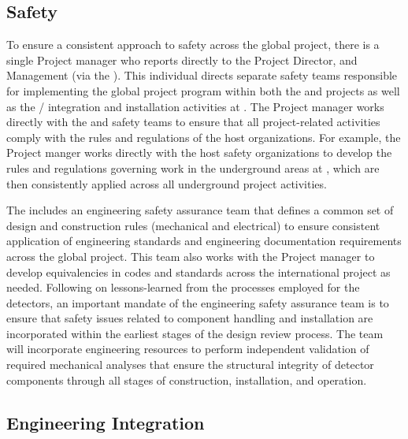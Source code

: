 \subsection{Safety}
\label{sec:dune_safety}

To ensure a consistent approach to safety across the global project,
there is a single Project  manager who reports directly to
the  Project Director,  and 
Management (via the  ).  This individual
directs separate safety teams responsible for implementing the global
project  program within both the  and
 projects as well as the /
integration and installation activities at .  The Project
 manager works directly with the  and  safety
teams to ensure that all project-related activities comply with the
rules and regulations of the host organizations.  For example, the
Project  manger works directly with the host safety
organizations to develop the rules and regulations governing work in
the underground areas at , which are then consistently applied
across all underground project activities.

The  includes an engineering safety assurance team that
defines a common set of design and construction rules (mechanical and
electrical) to ensure consistent application of engineering standards
and engineering documentation requirements across the global project.
This team also works with the Project  manager to develop
equivalencies in codes and standards across the international project
as needed.  Following on lessons-learned from the processes employed
for the  detectors, an important mandate of the
engineering safety assurance team is to ensure that safety issues
related to component handling and installation are incorporated within
the earliest stages of the design review process.  The 
team will incorporate engineering resources to perform independent
validation of required mechanical analyses that ensure the structural
integrity of detector components through all stages of construction,
installation, and operation.

\subsection{Engineering Integration}
\label{sec:dune_engineering}


